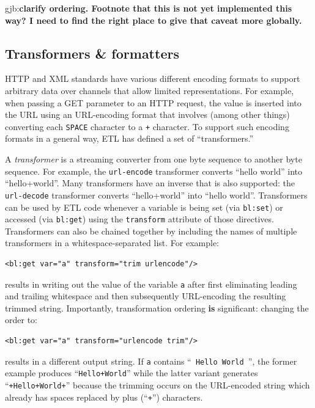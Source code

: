 \documentclass{www2003-submission}
\newcommand{\smtexttt}[1]{{\small\texttt{#1}}}
\newcommand{\gjb}[1]{{\sc gjb:}\textbf{#1}}
\begin{document}
\gjb{clarify ordering.  Footnote that this is not yet
implemented this way?  I need to find the right place to give that
caveat more globally.}

\subsection{Transformers \& formatters}
\label{ssec-transformers}

HTTP and XML standards have various different encoding formats to
support arbitrary data over channels that allow limited
representations.  For example, when passing a GET parameter to an HTTP
request, the value is inserted into the URL using an URL-encoding
format that involves (among other things) converting each
\smtexttt{SPACE} character to a \smtexttt{+} character.  To support
such encoding formats in a general way, ETL has defined a set of
``transformers.''

A \emph{transformer} is a streaming converter from one byte sequence to
another byte sequence.  For example, the \smtexttt{url-encode}
transformer converts ``hello world'' into ``hello+world''.  Many
transformers have an inverse that is also supported: the
\smtexttt{url-decode} transformer converts ``hello+world'' into ``hello
world''.  Transformers can be used by ETL code whenever a variable is
being set (via \smtexttt{bl:set}) or accessed (via \smtexttt{bl:get})
using the \smtexttt{transform} attribute of those directives.
Transformers can also be chained together by including the names of
multiple transformers in a whitespace-separated list.  For example:

\begin{verbatim}
<bl:get var="a" transform="trim urlencode"/>
\end{verbatim}

\noindent results in writing out the value of the variable \smtexttt{a}
after first eliminating leading and trailing whitespace and then
subsequently URL-encoding the resulting trimmed string.  Importantly,
transformation ordering \textbf{is} significant: changing the order to:

\begin{verbatim}
<bl:get var="a" transform="urlencode trim"/>
\end{verbatim}

\noindent results in a different output string.  If \smtexttt{a} contains
``\smtexttt{ Hello World }'', the former example produces ``\smtexttt{Hello+World}'' while
the latter variant generates ``\smtexttt{+Hello+World+}'' because the
trimming occurs on the URL-encoded string which already has spaces
replaced by plus (``\smtexttt{+}'') characters.
\end{document}
